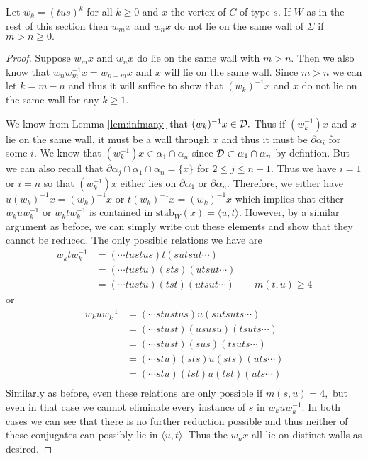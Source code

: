 \documentclass[class=book, crop=false,12 pt]{standalone}
\begin{document}
\begin{lemma}
	\label{lem:samewall}
	Let $w_k=(tus)^k$ for all $k\ge 0$ and $x$ the vertex of $C$ of type $s.$ If $W$ as in the rest of this section then $w_mx$ and $w_nx$ do not lie on the same wall of $\Sigma$ if $m>n\ge 0.$
\end{lemma}
\begin{proof}
	Suppose $w_mx$ and $w_nx$ do lie on the same wall with $m>n.$ Then we also know that $w_nw^{-1}_mx=w_{n-m}x$ and $x$ will lie on the same wall. Since $m>n$ we can let $k=m-n$ and thus it will suffice to show that $(w_k)^{-1}x$ and $x$ do not lie on the same wall for any $k\ge 1.$
	
We know from Lemma \ref{lem:infmany} that $(w_k)^{-1}x\in \mathcal{D}.$ Thus if $(w_k^{-1})x$ and $x$ lie on the same wall, it must be a wall through $x$ and thus it must be $\partial\alpha_i$ for some $i.$ We know that $(w_k^{-1})x\in \alpha_1\cap \alpha_n$ since $\mathcal{D}\subset \alpha_1\cap \alpha_n$ by defintion. But we can also recall that $\partial\alpha_j\cap \alpha_1\cap \alpha_n=\{x\}$ for $2\le j\le n-1.$ Thus we have $i=1$ or $i=n$ so that $(w_k^{-1})x$ either lies on $\partial\alpha_1$ or $\partial\alpha_n.$  Therefore, we either have $u(w_k)^{-1}x=(w_k)^{-1}x$ or $t(w_k)^{-1}x=(w_k)^{-1}x$ which implies that either $w_kuw_k^{-1}$ or $w_ktw_k^{-1}$ is contained in $\mathrm{stab}_W(x)=\langle u,t \rangle.$ However, by a similar argument as before, we can simply write out these elements and show that they cannot be reduced. The only possible relations we have are
\begin{align*}
	w_ktw_k^{-1}&=(\cdots tustus)t(sutsut\cdots)\\
		    &=(\cdots tustu)(sts)(utsut\cdots)\\
		    &=(\cdots tustu)(tst)(utsut\cdots)\qquad m(t,u)\ge 4
\end{align*}
or
\begin{align*}
	w_kuw_k^{-1}&=(\cdots stustus)u(sutsuts\cdots)\\
		    &=(\cdots stust)(ususu)(tsuts\cdots)\\
		    &=(\cdots stust)(sus)(tsuts\cdots)\\
		    &=(\cdots stu)(sts)u(sts)(uts\cdots)\\
		    &=(\cdots stu)(tst)u(tst)(uts\cdots)\\
\end{align*}
Similarly as before, even these relations are only possible if $m(s,u)=4,$ but even in that case we cannot eliminate every instance of $s$ in $w_kuw_k^{-1}.$ In both cases we can see that there is no further reduction possible and thus neither of these conjugates can possibly lie in $\langle u,t \rangle.$ Thus the $w_nx$ all lie on distinct walls as desired.
\end{proof}
\end{document}
